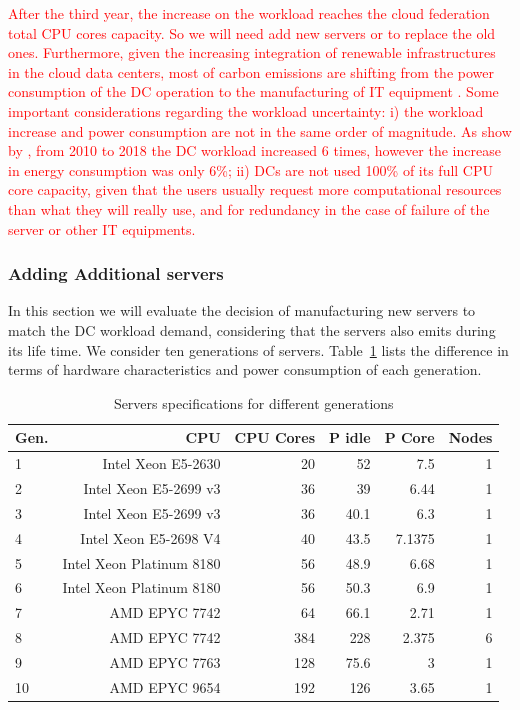 \textcolor{red}{ After the third year, the increase on the workload reaches the cloud federation total CPU cores capacity. So we will need add new servers or to replace the old ones. Furthermore, given the increasing integration of renewable infrastructures in the cloud data centers, most of carbon emissions are shifting from the power consumption of the DC operation to the manufacturing of IT equipment \cite{gupta2021_chasingcarbon}.
Some important considerations regarding the workload uncertainty: i) the workload increase and power consumption are not in the same order of magnitude. As show by \citet{masanet2020recalibrating}, from 2010 to 2018 the DC workload increased 6 times, however the increase in energy consumption was only 6\%; ii) DCs are not used 100\% of its full CPU core capacity, given that the users usually request more computational resources than what they will really use, and for redundancy in the case of failure of the server or other IT equipments.}


\subsubsection{Adding Additional servers}

In this section we will evaluate the decision of manufacturing new servers to match the DC workload demand, considering that the servers also emits  during its life time. We consider ten generations of servers. Table~\ref{tab:servers_specs} lists the difference in terms of hardware characteristics and power consumption of each generation. 

\begin{table}[H]
  
  \caption{Servers specifications for different generations} \centering
  \label{tab:servers_specs} 
  \begin{tabular}{|l|r|r|r|r|r|}
   \hline
    
  \textbf{Gen.} & \textbf{CPU} &   \textbf{CPU Cores} & \textbf{P idle}  & \textbf{P Core} & \textbf{Nodes} \\
  \hline
    1 & Intel Xeon E5-2630 & 20 & 52 & 7.5 & 1 \\
  \hline
    2 & Intel Xeon E5-2699 v3& 36 & 39 & 6.44 & 1  \\
  \hline
    3 & Intel Xeon E5-2699 v3 & 36 & 40.1 & 6.3 & 1 \\
  \hline
     4 & Intel Xeon E5-2698 V4 &  40 & 43.5 & 7.1375 & 1 \\
  \hline
    5 & Intel Xeon Platinum 8180 & 56 & 48.9 & 6.68 & 1 \\
  \hline
    6 & Intel Xeon Platinum 8180 & 56 & 50.3 & 6.9 & 1 \\
  \hline
    7 & AMD EPYC 7742  & 64 & 66.1 & 2.71 & 1 \\
  \hline
    8 & AMD EPYC 7742  & 384 & 228 & 2.375 & 6 \\
  \hline
    9 & AMD EPYC 7763 & 128 & 75.6 & 3 & 1 \\
  \hline
    10 & AMD EPYC 9654 & 192 & 126 & 3.65 & 1 \\
  \hline
\end{tabular}  
\end{table}


